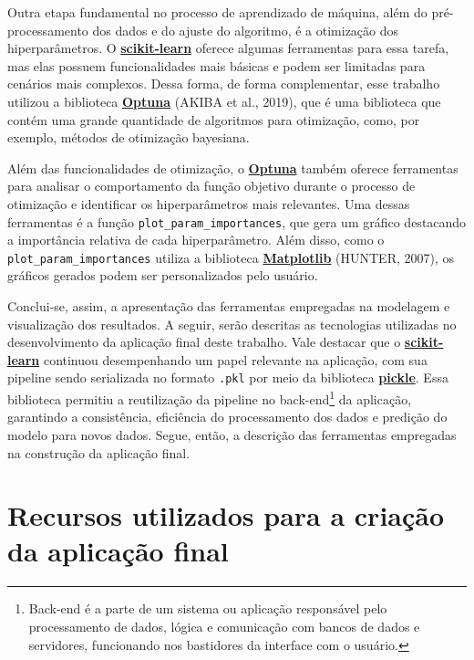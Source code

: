 \documentclass[
  12pt,
  a4paper,
]{scrreprt}
\begin{document}
Outra etapa fundamental no processo de aprendizado de máquina, além do
pré-processamento dos dados e do ajuste do algoritmo, é a otimização dos
hiperparâmetros. O
\href{https://scikit-learn.org/stable/}{\textbf{scikit-learn}} oferece
algumas ferramentas para essa tarefa, mas elas possuem funcionalidades
mais básicas e podem ser limitadas para cenários mais complexos. Dessa
forma, de forma complementar, esse trabalho utilizou a biblioteca
\href{https://optuna.org/}{\textbf{Optuna}} (AKIBA et al., 2019), que é
uma biblioteca que contém uma grande quantidade de algoritmos para
otimização, como, por exemplo, métodos de otimização bayesiana.

\vspace{12pt}

Além das funcionalidades de otimização, o
\href{https://optuna.org/}{\textbf{Optuna}} também oferece ferramentas
para analisar o comportamento da função objetivo durante o processo de
otimização e identificar os hiperparâmetros mais relevantes. Uma dessas
ferramentas é a função \texttt{plot\_param\_importances}, que gera um
gráfico destacando a importância relativa de cada hiperparâmetro. Além
disso, como o \texttt{plot\_param\_importances} utiliza a biblioteca
\href{https://matplotlib.org/}{\textbf{Matplotlib}} (HUNTER, 2007), os
gráficos gerados podem ser personalizados pelo usuário.

\vspace{12pt}

Conclui-se, assim, a apresentação das ferramentas empregadas na
modelagem e visualização dos resultados. A seguir, serão descritas as
tecnologias utilizadas no desenvolvimento da aplicação final deste
trabalho. Vale destacar que o
\href{https://scikit-learn.org/stable/}{\textbf{scikit-learn}} continuou
desempenhando um papel relevante na aplicação, com sua pipeline sendo
serializada no formato \texttt{.pkl} por meio da biblioteca
\href{https://docs.python.org/3/library/pickle.html}{\textbf{pickle}}.
Essa biblioteca permitiu a reutilização da pipeline no
back-end\footnote{Back-end é a parte de um sistema ou aplicação
  responsável pelo processamento de dados, lógica e comunicação com
  bancos de dados e servidores, funcionando nos bastidores da interface
  com o usuário.} da aplicação, garantindo a consistência, eficiência do
processamento dos dados e predição do modelo para novos dados. Segue,
então, a descrição das ferramentas empregadas na construção da aplicação
final.

\section{Recursos utilizados para a criação da aplicação
final}\label{recursos-utilizados-para-a-criauxe7uxe3o-da-aplicauxe7uxe3o-final}
\end{document}
